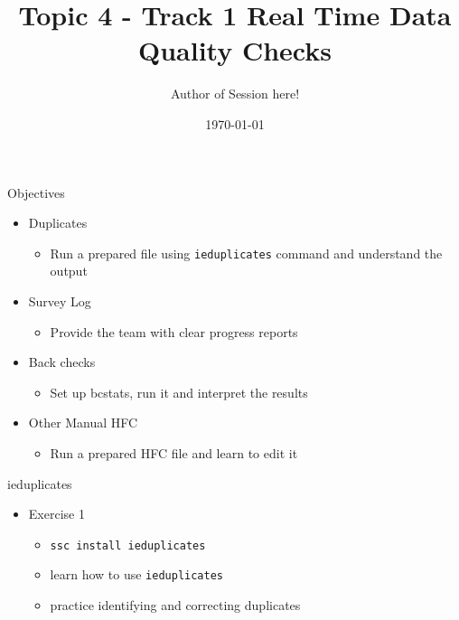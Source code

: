 \documentclass[aspectratio=169]{beamer}
\title{Topic 4 - Track 1 \newline Real Time Data Quality Checks}
\date{\today}
\author{Author of Session here!} %
\institute{Development Impact Evaluation (DIME) \newline The World Bank }
\begin{document}
	{
		\maketitle
	}

\begin{frame}{Objectives}
	\begin{itemize}
		\item Duplicates
		\begin{itemize}
			\item Run a prepared file using \texttt{ieduplicates} command and understand the output
		\end{itemize}
		\item Survey Log
		\begin{itemize}
			\item Provide the team with clear progress reports
		\end{itemize}
		\item Back checks
		\begin{itemize}
			\item Set up bcstats, run it and interpret the results
		\end{itemize}
		\item Other Manual HFC
		\begin{itemize}
			\item Run a prepared HFC file and learn to edit it
		\end{itemize}
	\end{itemize}
\end{frame}

\begin{frame}{ieduplicates}
	\begin{itemize}
		\item Exercise 1
		\begin{itemize}
			\item \texttt{ssc install ieduplicates}
			\item learn how to use \texttt{ieduplicates}
			\item practice identifying and correcting duplicates
		\end{itemize}
	\end{itemize}
\end{frame}
\end{document}

